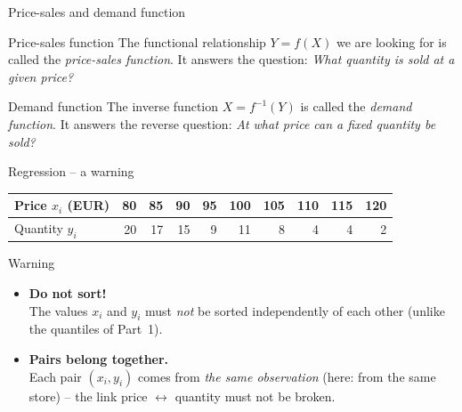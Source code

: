 \documentclass[aspectratio=169,11pt]{beamer}
\begin{document}
\begin{frame}{Price-sales and demand function}
  \begin{block}{Price-sales function}
    The functional relationship $Y = f(X)$ we are looking for is called
    the \emph{price-sales function}. It answers the question:
    \emph{What quantity is sold at a given price?}
  \end{block}

  \medskip

  \begin{block}{Demand function}
    The inverse function $X = f^{-1}(Y)$ is called the \emph{demand
    function}. It answers the reverse question: \emph{At what price
    can a fixed quantity be sold?}
  \end{block}
\end{frame}

\begin{frame}{Regression -- a warning}
  \begin{center}
    \begin{tabular}{lrrrrrrrrr}
      \toprule
      Price $x_i$ (EUR) & 80 & 85 & 90 & 95 & 100 & 105 & 110 & 115 & 120 \\
      \midrule
      Quantity $y_i$     & 20 & 17 & 15 & 9  & 11  & 8   & 4   & 4   & 2   \\
      \bottomrule
    \end{tabular}
  \end{center}

  \medskip

  \begin{alertblock}{Warning}
    \begin{itemize}
      \item \textbf{Do not sort!}\\
            The values $x_i$ and $y_i$ must \emph{not} be sorted
            independently of each other (unlike the quantiles of Part~1).
      \item \textbf{Pairs belong together.}\\
            Each pair $(x_i, y_i)$ comes from \emph{the same observation}
            (here: from the same store) -- the link
            price $\leftrightarrow$ quantity must not be broken.
    \end{itemize}
  \end{alertblock}
\end{frame}
\end{document}
